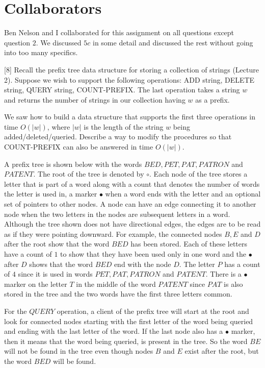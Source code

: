 \documentclass[addpoints]{exam}
\begin{document}
\section*{Collaborators}

Ben Nelson and I collaborated for this assignment on all questions except question $2$. We discussed $5c$ in some detail and discussed the rest without going into too many specifics.
\pointname{}\bonuspointname{}\pointformat{[\bfseries\thepoints]}
\begin{questions}

\color{qcolor}
[8]
Recall the prefix tree data structure for storing a collection of strings (Lecture 2). Suppose we wish to support the following operations: ADD string, DELETE string, QUERY string, COUNT-PREFIX. The last operation takes a string $w$ and returns the number of strings in our collection having $w$ as a prefix.

We saw how to build a data structure that supports the first three operations in time $O(|w|)$, where $|w|$ is the length of the string $w$ being added/deleted/queried. Describe a way to modify the procedures so that COUNT-PREFIX can also be answered in time $O(|w|)$.

\color{acolor}
A prefix tree is shown below with the words $BED, PET, PAT, PATRON$ and $PATENT$. The root of the tree is denoted by $\circ$. Each node of the tree stores a letter that is part of a word along with a count that denotes the number of words the letter is used in, a marker $\bullet$ when a word ends with the letter and an optional set of pointers to other nodes. A node can have an edge connecting it to another node when the two letters in the nodes are subsequent letters in a word. Although the tree shown does not have directional edges, the edges are to be read as if they were pointing downward. For example, the connected nodes $B, E $ and $D$ after the root show that the word $BED$ has been stored. Each of these letters have a count of $1$ to show that they have been used only in one word and the $\bullet$ after $D$ shows that the word $BED$ end with the node $D$. The letter $P$ has a count of $4$ since it is used in words $PET, PAT, PATRON$ and $PATENT$. There is a $\bullet$ marker on the letter $T$ in the middle of the word $PATENT$ since $PAT$ is also stored in the tree and the two words have the first three letters common. 

For the $QUERY$ operation, a client of the prefix tree will start at the root and look for connected nodes starting with the first letter of the word being queried and ending with the last letter of the word. If the last node also has a $\bullet$ marker, then it means that the word being queried, is present in the tree. So the word $BE$ will not be found in the tree even though nodes $B$ and $E$ exist after the root, but the word $BED$ will be found.


\end{questions}
\end{document}
